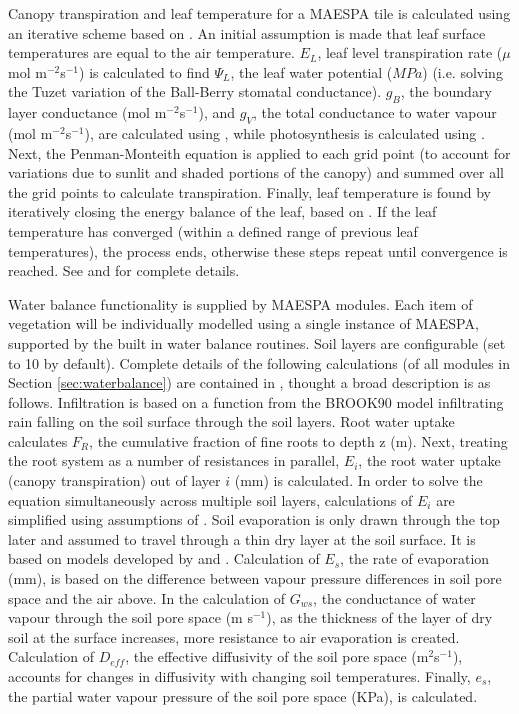 \documentclass[final,3p,times,authoryear]{elsarticle}
\begin{document}
Canopy transpiration and leaf temperature for a MAESPA tile is calculated using an iterative scheme based on \cite{Wang1998}. An initial assumption is made that leaf surface temperatures are equal to the air temperature. $E_{L}$, leaf level transpiration rate ($\mu$mol m$^{-2}$s$^{-1}$) is calculated to find $\Psi_{L}$, the leaf water potential ($MPa$) (i.e. solving the Tuzet variation of the Ball-Berry stomatal conductance). $g_{B}$, the boundary layer conductance (mol m$^{-2}$s$^{-1}$), and $g_{V}$, the total conductance to water vapour (mol m$^{-2}$s$^{-1}$), are calculated using \cite{Jones1992}, while photosynthesis is calculated using \cite{Farquhar1980}. Next, the Penman-Monteith equation \citep{Penman1948,Monteith1965} is applied to each grid point (to account for variations due to sunlit and shaded portions of the canopy) and summed over all the grid points to calculate transpiration. Finally, leaf temperature is found by iteratively closing the energy balance of the leaf, based on \cite{Wang1998}. If the leaf temperature has converged (within a defined range of previous leaf temperatures), the process ends, otherwise these steps repeat until convergence is reached. See \cite{Duursma2012} and \cite{Medlyn2007} for complete details.


\label{sec:waterbalance}
Water balance functionality is supplied by MAESPA modules. Each item of vegetation will be individually modelled using a single instance of MAESPA, supported by the built in water balance routines. Soil layers are configurable (set to 10 by default). Complete details of the following calculations (of all modules in Section \ref{sec:waterbalance}) are contained in \cite{Duursma2012}, thought a broad description is as follows. Infiltration is based on a function from the BROOK90 model \citep{Federer2003} infiltrating rain falling on the soil surface through the soil layers. Root water uptake calculates $F_{R}$, the cumulative fraction of fine roots to depth z (m). Next, treating the root system as a number of resistances in parallel, $E_{i}$, the root water uptake (canopy transpiration) out of layer $i$ (mm) is calculated. In order to solve the equation simultaneously across multiple soil layers, calculations of $E_{i}$ are simplified using assumptions of \cite{Taylor1975}. Soil evaporation is only drawn through the top later and assumed to travel through a thin dry layer at the soil surface. It is based on models developed by \cite{Choudhury1988} and \cite{Williams2001}. Calculation of $E_{s}$, the rate of evaporation (mm), is based on the difference between vapour pressure differences in soil pore space and the air above. In the calculation of $G_{ws}$, the conductance of water vapour through the soil pore space (m s$^{-1}$), as the thickness of the layer of dry soil at the surface increases, more resistance to air evaporation is created. Calculation of $D_{eff}$, the effective diffusivity of the soil pore space (m$^{2}$s$^{-1}$), accounts for changes in diffusivity with changing soil temperatures. Finally, $e_{s}$, the partial water vapour pressure of the soil pore space (KPa), is calculated. 
\end{document}
